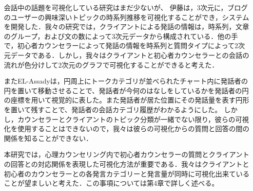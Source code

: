 \documentclass[shuuron]{kuee}
\begin{document}
会話中の話題を可視化している研究はまだ少ないが、
伊藤\cite{itoh2010interactive}は，3次元に，ブログのユーザーの興味深いトピックの時系列推移を可視化することができ，システムを開発した．我々の研究では，クライアントによる発話の情報は，時系列，文章のグループ，および文の数によって3次元データから構成されている．他の手で，初心者カウンセラーによって発話の情報を時系列と質問タイプによって2次元データである．しかし，我々はクライアントと初心者カウンセラーとの会話の流れが色分けして2次元のグラフで可視化することができると考えた．


またEL-Assady\cite{el2016contovi}は，円周上にトークカテゴリが並べられたチャート内に発話者の円を置いて移動させることで、発話者が今何のはなしをしているかを発話者の円の座標を用いて視覚的に表した。また発話者が居た位置にその発話量を表す円形を置いて残すことで、発話者の会話カテゴリ履歴がわかるようにした。
しかし，カウンセラーとクライアントのトピック分類が一緒でない限り，彼らの可視化を使用することはできないので，我々は彼らの可視化からの質問と回答の間の関係を知ることができない．


本研究では，心理カウンセリング内で初心者カウンセラーの質問とクライアントの回答との対応関係を表現した可視化方法が重要である．我々はクライアントと初心者のカウンセラーとの各発言カテゴリーと発言量が同時に可視化出来ていることが望ましいと考えた．この事項については第4章で詳しく述べる。
\end{document}
